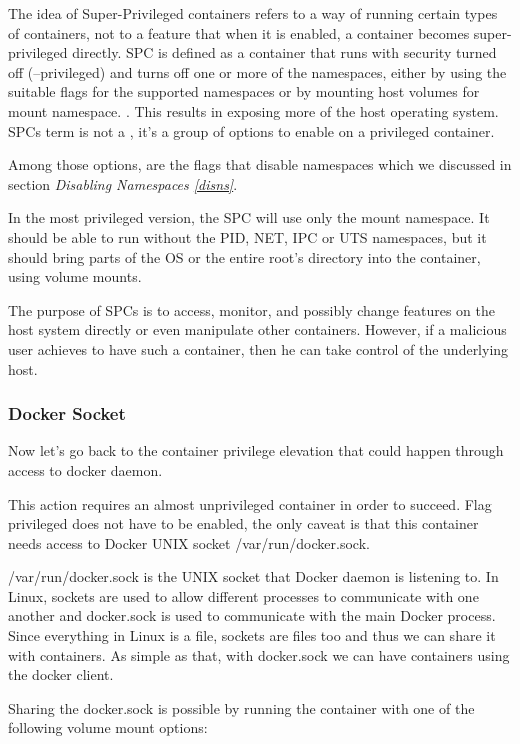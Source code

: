 \begin{description}[style=nextline]
The idea of Super-Privileged containers refers to a way of running certain types of containers, not to a feature that when it is enabled, a container becomes super-privileged directly. SPC is defined as a container that runs with security turned off (--privileged) and turns off one or more of the namespaces, either by using the suitable flags for the supported namespaces or by mounting host volumes for mount namespace. \cite{spcbydanwalsh}. This results in exposing more of the host operating system.
SPCs term is not a , it's a group of options to enable on a privileged container. 

Among those options, are the flags that disable namespaces which we discussed in section \textit{Disabling Namespaces \ref{disns}}.

In the most privileged version, the SPC will use only the mount namespace. It should be able to run without the PID, NET, IPC or UTS namespaces, but it should bring parts of the OS or the entire root's directory into the container, using volume mounts.

The purpose of SPCs is to access, monitor, and possibly change features on the host system directly or even manipulate other containers. However, if a malicious user achieves to have such a container, then he can take control of the underlying host.
\end{description}

\subsubsection{Docker Socket}
Now let's go back to the container privilege elevation that could happen through access to docker daemon.

This action requires an almost unprivileged container in order to succeed. Flag privileged does not have to be enabled, the only caveat is that this container needs access to Docker UNIX socket /var/run/docker.sock.

/var/run/docker.sock is the UNIX socket that Docker daemon is listening to. In Linux, sockets are used to allow different processes to communicate with one another and docker.sock is used to communicate with the main Docker process. Since everything in Linux is a file, sockets are files too and thus we can share it with containers. As simple as that, with docker.sock we can have containers using the docker client.

Sharing the docker.sock is possible by running the container with one of the following volume mount options:

